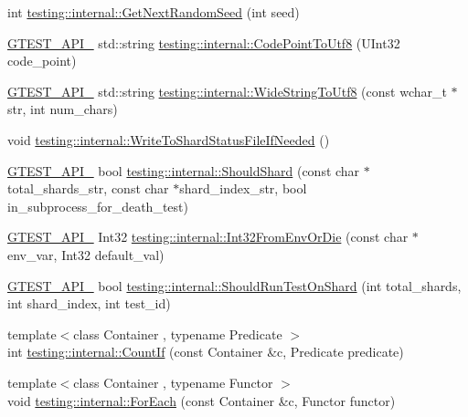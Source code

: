 \begin{DoxyCompactItemize}
\item 
int \hyperlink{namespacetesting_1_1internal_a6e07a655cb987d131cd8fbeba9a7f1eb}{testing\-::internal\-::\-Get\-Next\-Random\-Seed} (int seed)
\item 
\hyperlink{gtest-port_8h_aa73be6f0ba4a7456180a94904ce17790}{G\-T\-E\-S\-T\-\_\-\-A\-P\-I\-\_\-} std\-::string \hyperlink{namespacetesting_1_1internal_a0c0f9558efb9abb965851c4738cdc725}{testing\-::internal\-::\-Code\-Point\-To\-Utf8} (U\-Int32 code\-\_\-point)
\item 
\hyperlink{gtest-port_8h_aa73be6f0ba4a7456180a94904ce17790}{G\-T\-E\-S\-T\-\_\-\-A\-P\-I\-\_\-} std\-::string \hyperlink{namespacetesting_1_1internal_a05b8c86ff38243f34d8f839a0eadefb1}{testing\-::internal\-::\-Wide\-String\-To\-Utf8} (const wchar\-\_\-t $\ast$str, int num\-\_\-chars)
\item 
void \hyperlink{namespacetesting_1_1internal_a19b35b39782d41e6ef76e1910a3a502e}{testing\-::internal\-::\-Write\-To\-Shard\-Status\-File\-If\-Needed} ()
\item 
\hyperlink{gtest-port_8h_aa73be6f0ba4a7456180a94904ce17790}{G\-T\-E\-S\-T\-\_\-\-A\-P\-I\-\_\-} bool \hyperlink{namespacetesting_1_1internal_a0fe41657b1d1ab7ec4e37ec07403ee6c}{testing\-::internal\-::\-Should\-Shard} (const char $\ast$total\-\_\-shards\-\_\-str, const char $\ast$shard\-\_\-index\-\_\-str, bool in\-\_\-subprocess\-\_\-for\-\_\-death\-\_\-test)
\item 
\hyperlink{gtest-port_8h_aa73be6f0ba4a7456180a94904ce17790}{G\-T\-E\-S\-T\-\_\-\-A\-P\-I\-\_\-} Int32 \hyperlink{namespacetesting_1_1internal_aaa576613655c2f380278c255c3ec5fef}{testing\-::internal\-::\-Int32\-From\-Env\-Or\-Die} (const char $\ast$env\-\_\-var, Int32 default\-\_\-val)
\item 
\hyperlink{gtest-port_8h_aa73be6f0ba4a7456180a94904ce17790}{G\-T\-E\-S\-T\-\_\-\-A\-P\-I\-\_\-} bool \hyperlink{namespacetesting_1_1internal_a437bd89f5bc532778d7467600e210395}{testing\-::internal\-::\-Should\-Run\-Test\-On\-Shard} (int total\-\_\-shards, int shard\-\_\-index, int test\-\_\-id)
\item 
{\footnotesize template$<$class Container , typename Predicate $>$ }\\int \hyperlink{namespacetesting_1_1internal_a1e77a774d910346eff11a86d8df783a5}{testing\-::internal\-::\-Count\-If} (const Container \&c, Predicate predicate)
\item 
{\footnotesize template$<$class Container , typename Functor $>$ }\\void \hyperlink{namespacetesting_1_1internal_a52f5504ed65d116201ccb8f99a44fd7e}{testing\-::internal\-::\-For\-Each} (const Container \&c, Functor functor)

\end{DoxyCompactItemize}
